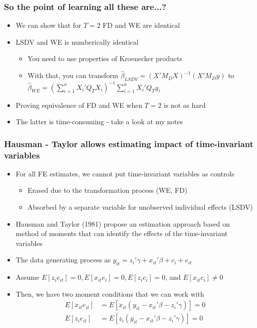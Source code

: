 \documentclass[aspectratio=169]{beamer}
\begin{document}
\begin{frame}
\frametitle{So the point of learning all these are...?}
\begin{itemize}
\item We can show that for $T=2$ FD and WE are identical
\item LSDV and WE is numberically identical
\begin{itemize}
\item You need to use properties of Kroenecker products
\item With that, you can transform $\hat{\beta}_{LSDV}=({X}'M_D{X})^{-1}({X}'M_D{y})$ to $ \hat{\beta}_{WE}=\left(\sum_{i=1}^n{X}_i'Q_T{X}_i\right)^{-1}\sum_{i=1}^n{X}_i'Q_T{y}_i$
\end{itemize}
\item Proving equivalence of FD and WE when $T=2$ is not as hard
\item The latter is time-consuming - take a look at my notes
 \end{itemize}
\end{frame}

\begin{frame}
\frametitle{Hausman - Taylor allows estimating impact of time-invariant variables}
\begin{itemize}
\item For all FE estimates, we cannot put time-invariant variables as controls
\begin{itemize}
\item Erased due to the transformation process (WE, FD) 
\item Absorbed by a separate variable for unobserved individual effects (LSDV)
\end{itemize}
\item Hausman and Taylor (1981) propose an estimation approach based on method of moments that can identify the effects of the time-invariant variables
\item The data generating process as $y_{it}=z_{i}'\gamma+x_{it}'\beta+c_i+e_{it}$
\item Assume $E[z_ie_{it}]=0, E[x_{it}e_i]=0, E[z_ic_i]=0$, and $E[x_{it}c_i]\neq0$ 
\item Then, we have two moment conditions that we can work with
\[
\begin{aligned}
E[\ddot{x}_{it}e_{it}]&=E[\ddot{x}_{it}(y_{it}-x_{it}'\beta-z_i'\gamma)]=0\\
E[z_{i}e_{it}]&=E[z_{i}(y_{it}-x_{it}'\beta-z_i'\gamma)]=0
\end{aligned}
\]
 \end{itemize}
\end{frame}
\end{document}
